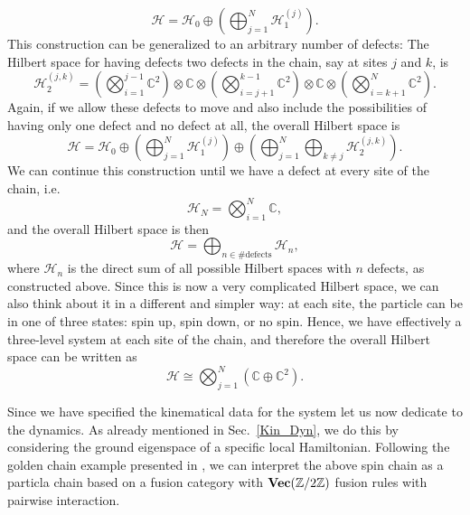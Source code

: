 	\begin{equation}
		\mathcal{H}=\mathcal{H}_0\oplus\left(\bigoplus_{j=1}^N\mathcal{H}_1^{(j)}\right).
	\end{equation}
This construction can be generalized to an arbitrary number of defects: The Hilbert space for having defects two defects in the chain, say at sites $j$ and $k$, is 
	\begin{equation}
		\mathcal{H}_2^{(j,k)}=\left(\bigotimes_{i=1}^{j-1}\mathbb{C}^2\right)\otimes\mathbb{C}\otimes\left(\bigotimes_{i=j+1}^{k-1}\mathbb{C}^2\right)\otimes\mathbb{C}\otimes\left(\bigotimes_{i=k+1}^{N}\mathbb{C}^2\right).
	\end{equation}
Again, if we allow these defects to move and also include the possibilities of having only one defect and no defect at all, the overall Hilbert space is
	\begin{equation}
		\mathcal{H}=\mathcal{H}_0\oplus\left(\bigoplus_{j=1}^N\mathcal{H}_1^{(j)}\right)\oplus\left(\bigoplus_{j=1}^N\bigoplus_{k\neq j}\mathcal{H}_2^{(j,k)}\right).
	\end{equation}
We can continue this construction until we have a defect at every site of the chain, i.e.
	\begin{equation}
		\mathcal{H}_N=\bigotimes_{i=1}^N\mathbb{C},
	\end{equation}
and the overall Hilbert space is then
	\begin{equation}
		\mathcal{H}=\bigoplus_{n\in\#\mathrm{defects}}\mathcal{H}_n,
	\end{equation}
where $\mathcal{H}_n$ is the direct sum of all possible Hilbert spaces with $n$ defects, as constructed above. Since this is now a very complicated Hilbert space, we can also think about it in a different and simpler way: at each site, the particle can be in one of three states: spin up, spin down, or no spin. Hence, we have effectively a three-level system at each site of the chain, and therefore the overall Hilbert space can be written as
	\begin{equation}
		\mathcal{H}\cong\bigotimes_{j=1}^N\left(\mathbb{C}\oplus\mathbb{C}^2\right).
	\end{equation}

Since we have specified the kinematical data for the system let us now dedicate to the dynamics. As already mentioned in Sec.~\ref{Kin_Dyn}, we do this by considering the ground eigenspace of a specific local Hamiltonian. Following the golden chain example presented in \cite{Feiguin2007}, we can interpret the above spin chain as a particla chain based on a fusion category with $\textbf{Vec}(\mathbb{Z}/2\mathbb{Z})$ fusion rules with pairwise interaction.

